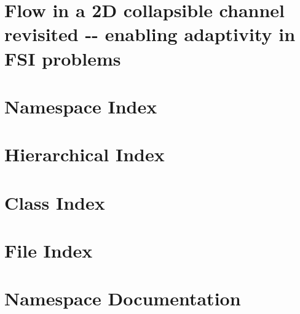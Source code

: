\documentclass[twoside]{book}
\newcommand{\+}{\discretionary{\mbox{\scriptsize$\hookleftarrow$}}{}{}}
\begin{document}
\hypersetup{pageanchor=false,
             bookmarksnumbered=true
            }
\hypersetup{pageanchor=true}

\chapter{Flow in a 2D collapsible channel revisited -\/-\/ enabling adaptivity in F\+SI problems}
\label{index}\hypertarget{index}{}
\chapter{Namespace Index}

\chapter{Hierarchical Index}

\chapter{Class Index}

\chapter{File Index}

\chapter{Namespace Documentation}



\end{document}

